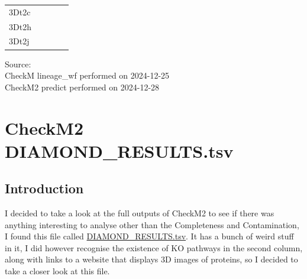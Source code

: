 \documentclass[
  letterpaper,
  DIV=11,
  numbers=noendperiod]{scrreprt}
\begin{document}
\begin{table}
{\begin{tabular*}{\linewidth}{@{\extracolsep{\fill}}lrrrr}
3Dt2c & {\cellcolor[HTML]{549DCC}{\textcolor[HTML]{FFFFFF}{95.75}}} & {\cellcolor[HTML]{FEC793}{\textcolor[HTML]{000000}{0.85}}} & {\cellcolor[HTML]{08326D}{\textcolor[HTML]{FFFFFF}{99.94}}} & {\cellcolor[HTML]{FEE5CC}{\textcolor[HTML]{000000}{0.39}}} \\ 
3Dt2h & {\cellcolor[HTML]{808080}{\textcolor[HTML]{FFFFFF}{87.98}}} & {\cellcolor[HTML]{FEDEBF}{\textcolor[HTML]{000000}{0.51}}} & {\cellcolor[HTML]{808080}{\textcolor[HTML]{FFFFFF}{86.04}}} & {\cellcolor[HTML]{FFF1E3}{\textcolor[HTML]{000000}{0.10}}} \\ 
3Dt2j & {\cellcolor[HTML]{4493C7}{\textcolor[HTML]{FFFFFF}{96.19}}} & {\cellcolor[HTML]{FDA761}{\textcolor[HTML]{000000}{1.21}}} & {\cellcolor[HTML]{083573}{\textcolor[HTML]{FFFFFF}{99.80}}} & {\cellcolor[HTML]{FFF5EB}{\textcolor[HTML]{000000}{0.00}}} \\ 
\bottomrule
\end{tabular*}
\begin{minipage}{\linewidth}
Source:\\
CheckM lineage\_wf performed on 2024-12-25\\
CheckM2 predict performed on 2024-12-28\\
\end{minipage}

}

\end{table}%

\section{CheckM2
DIAMOND\_RESULTS.tsv}\label{checkm2-diamond_results.tsv}

\subsection{Introduction}\label{introduction-6}

I decided to take a look at the full outputs of CheckM2 to see if there
was anything interesting to analyse other than the Completeness and
Contamination, I found this file called
\href{https://github.com/tobiasnunn/tnunn_research/blob/main/Research_Experience_Module/02_middle-analysis_outputs/CheckM2_20241228/diamond_output/DIAMOND_RESULTS.tsv}{DIAMOND\_RESULTS.tsv}.
It has a bunch of weird stuff in it, I did however recognise the
existence of KO pathways in the second column, along with links to a
website that displays 3D images of proteins, so I decided to take a
closer look at this file.
\end{document}
